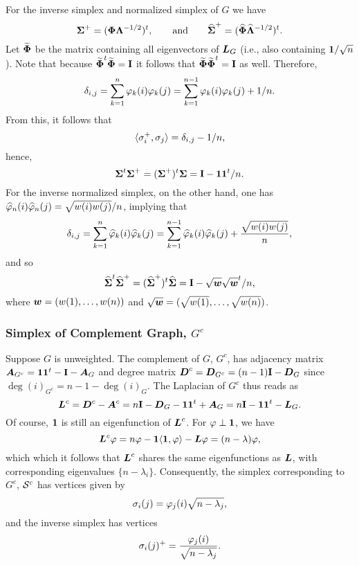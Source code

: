 For the inverse simplex and normalized simplex of $G$ we have 
\[\boldsymbol{\Sigma}^+ = (\boldsymbol{\Phi}\vb{\Lambda}^{-1/2})^t,\qquad \text{and} \qquad \widehat{\boldsymbol{\Sigma}}^+ = (\widehat{\boldsymbol{\Phi}}\widehat{\vb{\Lambda}}^{-1/2})^t.\]
Let $\widetilde{\boldsymbol{\Phi}}$ be the matrix containing all eigenvectors of $\vb*{L}_G$ (i.e., also containing $\vb{1}/\sqrt{n}$).  Note that because $\widetilde{\boldsymbol{\Phi}}^t \widetilde{\boldsymbol{\Phi}}=\vb{I}$ it follows that $\widetilde{\boldsymbol{\Phi}}\widetilde{\boldsymbol{\Phi}}^t=\vb{I}$ as well. Therefore, 
\begin{equation*}\delta_{i,j}=\sum_{k=1}^n \varphi_k(i)\varphi_k(j) = \sum_{k=1}^{n-1} \varphi_k(i)\varphi_k(j) + 1/n.
\end{equation*}
From this, it follows that 
\[\langle\sigma_i^+,\sigma_j\rangle = \delta_{i,j} - 1/n,\]
hence, 
\begin{equation}
\label{eq:sv+sv}
    \boldsymbol{\Sigma}^t\boldsymbol{\Sigma}^+=(\boldsymbol{\Sigma}^+)^t\boldsymbol{\Sigma}=\vb{I}-\vb{1}\vb{1}^t/n.
\end{equation}
For the inverse normalized simplex, on the other hand, one has $\widehat{\varphi}_{n}(i)\widehat{\varphi}_{n}(j)=\sqrt{w(i)w(j)}/n$, implying that 
\begin{equation*}\delta_{i,j}=\sum_{k=1}^n \widehat{\varphi}_k(i)\widehat{\varphi}_k(j) = \sum_{k=1}^{n-1} \widehat{\varphi}_k(i)\widehat{\varphi}_k(j) + \frac{\sqrt{w(i)w(j)}}{n},
\end{equation*}
and so 
\begin{equation}
\label{eq:svn+svn}
\widehat{\boldsymbol{\Sigma}}^t\widehat{\boldsymbol{\Sigma}}^+=(\widehat{\boldsymbol{\Sigma}}^+)^t\widehat{\boldsymbol{\Sigma}}=\vb{I}-\sqrt{\vb*{w}}\sqrt{\vb*{w}}^t/n,
\end{equation}
where $\vb*{w}=(w(1),\dots,w(n))$ and $\sqrt{\vb*{w}}=(\sqrt{w(1)},\dots,\sqrt{w(n)})$. 




\subsubsection{Simplex of Complement Graph, $G^c$}
Suppose $G$ is unweighted. The complement of $G$, $G^c$, has adjacency matrix $\vb*{A}_{G^c}=\vb{1}\vb{1}^t - \vb{I}-\vb*{A}_G$ and degree matrix $\vb*{D}^c=\vb*{D}_{G^c}=(n-1)\vb{I}-\vb*{D}_G$ since $\deg(i)_{G^c}=n-1-\deg(i)_G$. The Laplacian of $G^c$ thus reads as 
\[\vb*{L}^c=\vb*{D}^c-\vb*{A}^c=n\vb{I}-\vb*{D}_G-\vb{1}\vb{1}^t+\vb*{A}_G=n\vb{I}-\vb{1}\vb{1}^t-\vb*{L}_G.\]
Of course, $\vb{1}$ is still an eigenfunction of $\vb*{L}^c$. For $\varphi\perp \vb{1}$, we have 
\[\vb*{L}^c\varphi = n\varphi - \vb{1}\langle \vb{1},\varphi\rangle - \vb*{L}\varphi = (n-\lambda)\varphi,\]
which which it follows that $\vb*{L}^c$ shares the same eigenfunctions as $\vb*{L}$, with corresponding eigenvalues $\{n-\lambda_i\}$. Consequently, the simplex corresponding to $G^c$, $\mathcal{S}^c$ has vertices given by 
\[\sigma_i(j) = \varphi_j(i) \sqrt{n-\lambda_j},\]
and the inverse simplex has vertices 
\[\sigma_i(j)^+=\frac{\varphi_j(i)}{\sqrt{n-\lambda_j}}. \]

